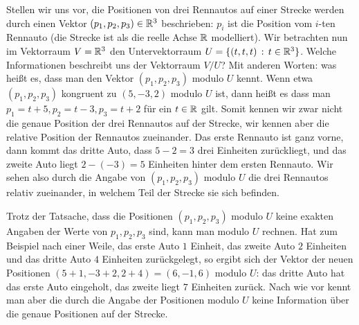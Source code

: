 \begin{bsp}
	Stellen wir uns vor, die Positionen von drei Rennautos auf einer Strecke werden durch einen Vektor $(p_1, p_2, p_3) \in \mathbb R^3$ beschrieben: $p_i$ ist die Position vom $i$-ten Rennauto (die Strecke ist als die reelle Achse $\mathbb R$ modelliert). Wir betrachten nun im Vektorraum $ V =\mathbb R^3$ den Untervektorraum $U = \{ (t,t,t) \, : \, t \in \mathbb R^3 \}$. Welche Informationen beschreibt uns der Vektorraum $V / U$? Mit anderen Worten: was heißt es, dass man den Vektor $(p_1, p_2, p_3)$ modulo $U$ kennt. Wenn etwa 
	$(p_1,p_2,p_3)$ kongruent zu $(5,-3,2)$  modulo $U$ ist, dann heißt es 
	dass man $p_1 = t +5, p_2 = t -3, p_3 = t + 2$ für ein $t \in \mathbb R$ gilt. Somit kennen wir zwar nicht die genaue Position der drei Rennautos auf der Strecke, wir kennen aber die relative Position der Rennautos zueinander. Das erste Rennauto ist ganz vorne, dann kommt das dritte Auto, dass $5-2=3$ drei Einheiten zurückliegt, und das zweite Auto liegt $2-(-3) = 5$ Einheiten hinter dem ersten Rennauto. Wir sehen also durch die Angabe von $(p_1,p_2,p_3)$ modulo $U$ die drei Rennautos relativ zueinander, in welchem Teil der Strecke sie sich befinden. 

\begin{center}
\end{center} 

Trotz der Tatsache, dass die Positionen $(p_1,p_2,p_3)$ modulo $U$ keine exakten Angaben der Werte von $p_1, p_2, p_3$ sind, kann man modulo $U$ rechnen. Hat zum Beispiel nach einer Weile, das erste Auto $1$ Einheit, das zweite Auto $2$ Einheiten und das dritte Auto $4$ Einheiten zurückgelegt, so ergibt sich der Vektor der neuen Positionen $(5+1,-3+2,2+4) = (6,-1,6)$ modulo $U$: das dritte Auto hat das erste Auto eingeholt, das zweite liegt $7$ Einheiten zurück. Nach wie vor kennt man aber die durch die Angabe der Positionen modulo $U$ keine  Information über die genaue Positionen auf der Strecke. 
\end{bsp} 


